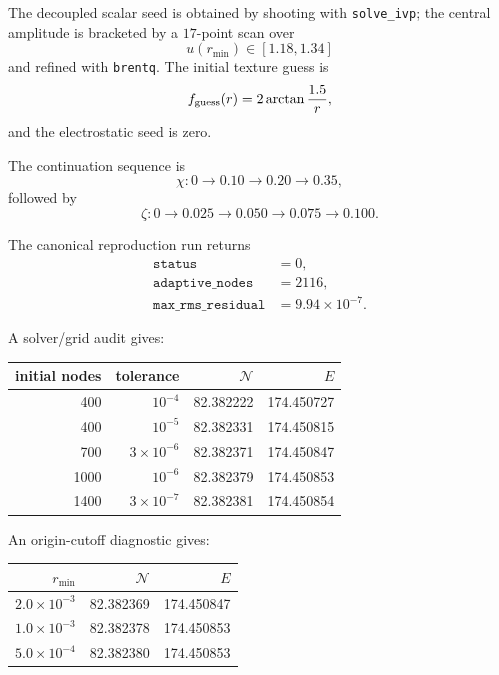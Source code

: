 \documentclass[11pt]{article}
\begin{document}
The decoupled scalar seed is obtained by shooting with \texttt{solve\_ivp}; the central amplitude is bracketed by a \(17\)-point scan over
\begin{equation}
u(r_{\min})\in[1.18,1.34]
\end{equation}
and refined with \texttt{brentq}. The initial texture guess is
\begin{equation}
f_{\rm guess}(r)
=
2\arctan\frac{1.5}{r},
\end{equation}
and the electrostatic seed is zero.

The continuation sequence is
\begin{equation}
\chi:
0\to0.10\to0.20\to0.35,
\end{equation}
followed by
\begin{equation}
\zeta:
0\to0.025\to0.050\to0.075\to0.100.
\end{equation}

The canonical reproduction run returns
\begin{align}
\texttt{status}&=0,\\
\texttt{adaptive\_nodes}&=2116,\\
\texttt{max\_rms\_residual}
&=9.94\times10^{-7}.
\end{align}

A solver/grid audit gives:
\begingroup
\small
\setlength{\tabcolsep}{3pt}
\begin{center}
\begin{tabular}{rrrr}
\toprule
initial nodes & tolerance & \(\mathcal N\) & \(E\)\\
\midrule
400  & \(10^{-4}\) & 82.382222 & 174.450727\\
400  & \(10^{-5}\) & 82.382331 & 174.450815\\
700  & \(3\times10^{-6}\) & 82.382371 & 174.450847\\
1000 & \(10^{-6}\) & 82.382379 & 174.450853\\
1400 & \(3\times10^{-7}\) & 82.382381 & 174.450854\\
\bottomrule
\end{tabular}
\end{center}
\endgroup

An origin-cutoff diagnostic gives:
\begin{center}
\begin{tabular}{rrr}
\toprule
\(r_{\min}\) & \(\mathcal N\) & \(E\)\\
\midrule
\(2.0\times10^{-3}\) & 82.382369 & 174.450847\\
\(1.0\times10^{-3}\) & 82.382378 & 174.450853\\
\(5.0\times10^{-4}\) & 82.382380 & 174.450853\\
\bottomrule
\end{tabular}
\end{center}
\end{document}

